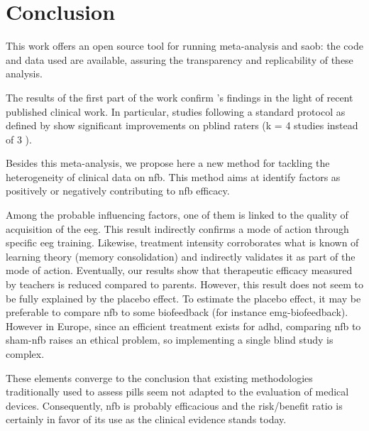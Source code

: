 

\section{Conclusion}

This work offers an open source tool for running meta-analysis and \gls{saob}: the code and data used are available, 
assuring the transparency and replicability of these analysis. 

The results of the first part of the work confirm \citet{Cortese2016}'s findings in the light of recent published clinical work.
In particular, studies following a standard protocol as defined by \citet{Arns2014} show significant improvements on \gls{pblind}
raters (k = 4 studies instead of 3 \citet{Cortese2016}).

Besides this meta-analysis, we propose here a new method for tackling the heterogeneity of clinical data on \gls{nfb}. This method aims at identify factors 
as positively or negatively contributing to \gls{nfb} efficacy. 

Among the probable influencing factors, one of them is linked to the quality
of acquisition of the \gls{eeg}. This result indirectly confirms a mode of action through specific \gls{eeg} training.
Likewise, treatment intensity corroborates what is known of learning theory (memory consolidation) \citep{Mowrer1960} and indirectly validates it as
part of the mode of action. Eventually, our results show that therapeutic efficacy measured by teachers is reduced compared to parents.
However, this result does not seem to be fully explained by the placebo effect. To estimate the placebo effect, it may be preferable to compare \gls{nfb}
to some biofeedback (for instance \gls{emg}-biofeedback). However in Europe, since an efficient treatment exists for \gls{adhd}, 
comparing \gls{nfb} to sham-\gls{nfb} raises an ethical problem, so implementing a single blind study is complex.

These elements converge to the conclusion that existing methodologies traditionally used to assess pills seem not adapted to the evaluation 
of medical devices. Consequently, \gls{nfb} is probably efficacious and the risk/benefit ratio is certainly in favor of its use as the
clinical evidence stands today.

